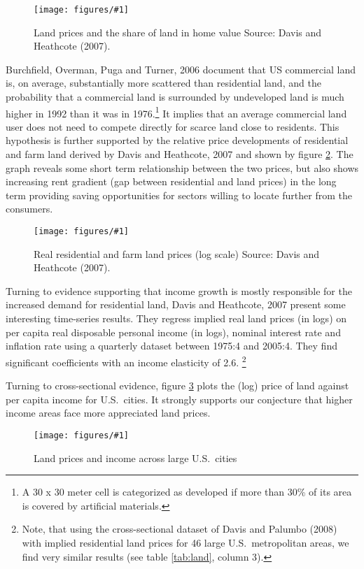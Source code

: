 \documentclass[12pt]{article}
\newcommand{\dofigure}[2]{\begin{figure}
\begin{centering}
\texttt{[image: figures/\#1]}
  \caption{#2\label{fig:#1}}
\end{centering}
\end{figure}}
\begin{document}
\dofigure{dh-shares}{Land prices and the share of land in home value\newline
\small Source: Davis and Heathcote (2007).}


Burchfield, Overman, Puga and Turner, 2006 document that US commercial land is, on average, substantially more scattered than residential land, and the probability that a commercial land is surrounded by undeveloped land is much higher in 1992 than it was in 1976.\footnote{A 30 x 30 meter cell is categorized as developed if more than 30\% of its area is covered by artificial materials.} It implies that an average commercial land user does not need to compete directly for scarce land close to residents. This hypothesis is further supported by the relative price developments of residential and farm land derived by Davis and Heathcote, 2007 and shown by figure \ref{fig:dh-prices}. The graph reveals some short term relationship between the two prices, but also shows increasing rent gradient (gap between residential and land prices) in the long term providing saving opportunities for sectors willing to locate further from the consumers.

\dofigure{dh-prices}{Real residential and farm land prices (log scale)\newline
\small Source: Davis and Heathcote (2007).}

Turning to evidence supporting that income growth is mostly responsible for the increased demand for residential land, Davis and Heathcote, 2007 present some interesting time-series results. They regress implied real land prices (in logs) on per capita real disposable personal income (in logs), nominal interest rate and inflation rate using a quarterly dataset between 1975:4 and 2005:4. They find significant coefficients with an income elasticity of 2.6. \footnote{Note, that using the cross-sectional dataset of Davis and Palumbo (2008) with implied residential land prices for 46 large U.S.~metropolitan areas, we find very similar results (see table \ref{tab:land}, column 3).}

Turning to cross-sectional evidence, figure \ref{fig:sc_davis} plots the (log) price of land against per capita income for U.S.~cities. It strongly supports our conjecture that higher income areas face more appreciated land prices.

\dofigure{sc_davis}{Land prices and income across large U.S.~cities}
\end{document}
